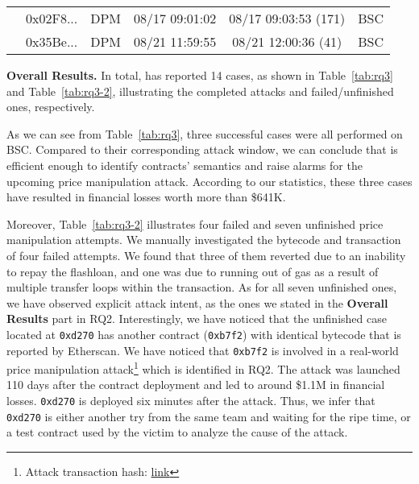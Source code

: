 \begin{table}[]
{\begin{tabular}{@{}cclccc@{}}
                                                                                   & 0x02F8...  & DPM      & 08/17 09:01:02       & 08/17 09:03:53 (171) & BSC            \\
                                                                                   & 0x35Be...  & DPM      & 08/21 11:59:55       & 08/21 12:00:36 (41)  & BSC            \\ \bottomrule
\end{tabular}%
}
\vspace{-0.1in}
\end{table}

\noindent
\textbf{Overall Results.}
In total, {\tool} has reported 14 cases, as shown in Table~\ref{tab:rq3} and Table~\ref{tab:rq3-2}, illustrating the completed attacks and failed/unfinished ones, respectively.

As we can see from Table~\ref{tab:rq3}, three successful cases were all performed on BSC.
Compared to their corresponding attack window, we can conclude that {\tool} is efficient enough to identify contracts' semantics and raise alarms for the upcoming price manipulation attack.
According to our statistics, these three cases have resulted in financial losses worth more than \$641K.



Moreover, Table~\ref{tab:rq3-2} illustrates four failed and seven unfinished price manipulation attempts.
We manually investigated the bytecode and transaction of four failed attempts. We found that three of them reverted due to an inability to repay the flashloan, and one was due to running out of gas as a result of multiple transfer loops within the transaction.
As for all seven unfinished ones, we have observed explicit attack intent, as the ones we stated in the \textbf{Overall Results} part in RQ2.
Interestingly, we have noticed that the unfinished case located at \texttt{0xd270} has another contract (\texttt{0xb7f2}) with identical bytecode that is reported by Etherscan. We have noticed that \texttt{0xb7f2} is involved in a real-world price manipulation attack\footnote{Attack transaction hash: \href{https://etherscan.io/tx/0x758efef41e60c0f218682e2fa027c54d8b67029d193dd7277d6a881a24b9a561}{link}} which is identified in RQ2. The attack was launched 110 days after the contract deployment and led to around \$1.1M in financial losses. \texttt{0xd270} is deployed six minutes after the attack. 
Thus, we infer that \texttt{0xd270} is either another try from the same team and waiting for the ripe time, or a test contract used by the victim to analyze the cause of the attack.



